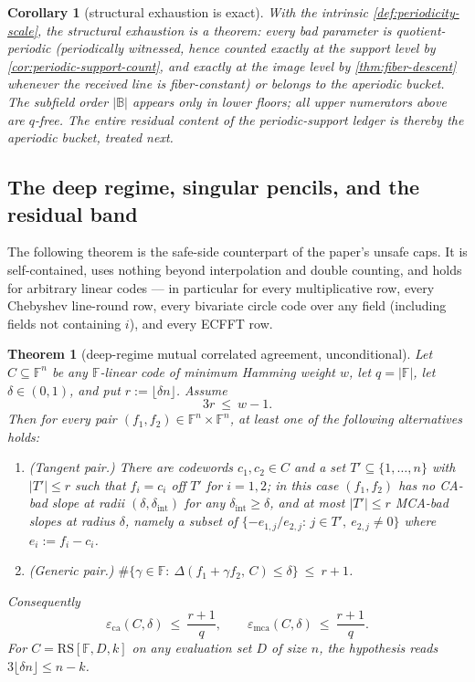 \documentclass[11pt]{article}
\newtheorem{theorem}{Theorem}[section]
\newtheorem{corollary}[corollary]{Corollary}
\theoremstyle{definition}
\theoremstyle{remark}
\newcommand{\F}{\mathbb{F}}
\newcommand{\B}{\mathbb{B}}
\newcommand{\RS}{\mathrm{RS}}
\newcommand{\eca}{\varepsilon_{\mathrm{ca}}}
\newcommand{\emca}{\varepsilon_{\mathrm{mca}}}
\newcommand{\dist}{\Delta}
\begin{document}
\begin{corollary}[structural exhaustion is exact]\label{cor:T1-status}
With the intrinsic \cref{def:periodicity-scale}, the structural exhaustion is a theorem: every bad parameter is quotient-periodic \textup(periodically witnessed, hence counted exactly at the support level by \cref{cor:periodic-support-count}, and exactly at the image level by \cref{thm:fiber-descent} whenever the received line is fiber-constant\textup) or belongs to the aperiodic bucket. The subfield order $|\B|$ appears only in lower floors; all upper numerators above are $q$-free. The entire residual content of the periodic-support ledger is thereby the aperiodic bucket, treated next.
\end{corollary}

\subsection{The deep regime, singular pencils, and the residual band}\label{sec:discharge-T2}

The following theorem is the safe-side counterpart of the paper's unsafe caps. It is self-contained, uses nothing beyond interpolation and double counting, and holds for arbitrary linear codes --- in particular for every multiplicative row, every Chebyshev line-round row, every bivariate circle code over any field \textup(including fields not containing $i$\textup), and every ECFFT row.

\begin{theorem}[deep-regime mutual correlated agreement, unconditional]\label{thm:deep-mca}
Let $C\subseteq\F^n$ be any $\F$-linear code of minimum Hamming weight $w$, let $q=|\F|$, let $\delta\in(0,1)$, and put $r:=\lfloor\delta n\rfloor$. Assume
\[
3r\ \le\ w-1 .
\]
Then for every pair $(f_1,f_2)\in\F^n\times\F^n$, at least one of the following alternatives holds:
\begin{enumerate}[label=\textup{(\alph*)}]
\item \textup{(Tangent pair.)} There are codewords $c_1,c_2\in C$ and a set $T'\subseteq\{1,\dots,n\}$ with $|T'|\le r$ such that $f_i=c_i$ off $T'$ for $i=1,2$; in this case $(f_1,f_2)$ has no CA-bad slope at radii $(\delta,\delta_{\mathrm{int}})$ for any $\delta_{\mathrm{int}}\ge\delta$, and at most $|T'|\le r$ MCA-bad slopes at radius $\delta$, namely a subset of $\{-e_{1,j}/e_{2,j}:\,j\in T',\ e_{2,j}\ne0\}$ where $e_i:=f_i-c_i$.
\item \textup{(Generic pair.)} $\#\{\gamma\in\F:\ \dist(f_1+\gamma f_2,\,C)\le\delta\}\ \le\ r+1$.
\end{enumerate}
Consequently
\[
\eca(C,\delta)\ \le\ \frac{r+1}q,
\qquad
\emca(C,\delta)\ \le\ \frac{r+1}q .
\]
For $C=\RS[\F,D,k]$ on any evaluation set $D$ of size $n$, the hypothesis reads $3\lfloor\delta n\rfloor\le n-k$.
\end{theorem}
\end{document}
